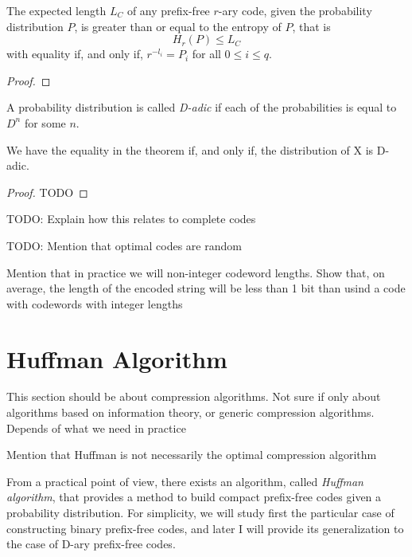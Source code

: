 \begin{theorem}
\label{th:optimal_codes}
The expected length $L_{C}$ of any prefix-free $r$-ary code, given the probability distribution $P$, is greater than or equal to the entropy of $P$, that is
\[
H_{r}(P) \leq L_{C}
\]
with equality if, and only if, $r^{-l_{i}} = P_{i}$ for all $0 \leq i \leq q$.
\end{theorem}
\begin{proof}
\end{proof}

\begin{definition}
A probability distribution is called \emph{D-adic} if each of the probabilities is equal to $D^n$ for some $n$.
\end{definition}

\begin{corollary}
We have the equality in the theorem if, and only if, the distribution of X is D-adic.
\end{corollary}
\begin{proof}
{\color{red} TODO}
\end{proof}

{\color{red} TODO: Explain how this relates to complete codes}

{\color{red} TODO: Mention that optimal codes are random}

{\color{red} Mention that in practice we will non-integer codeword lengths. Show that, on average, the length of the encoded string will be less than 1 bit than usind a code with codewords with integer lengths} 

%
%

\section{Huffman Algorithm}
\label{sec:Huffman-Algorithm}

{\color{red} This section should be about compression algorithms. Not sure if only about algorithms based on information theory, or generic compression algorithms. Depends of what we need in practice}

{\color{red} Mention that Huffman is not necessarily the optimal compression algorithm}

From a practical point of view, there exists an algorithm, called \emph{Huffman algorithm}, that provides a method to build compact prefix-free codes given a probability distribution. For simplicity, we will study first the particular case of constructing binary prefix-free codes, and later I will provide its generalization to the case of D-ary prefix-free codes.

